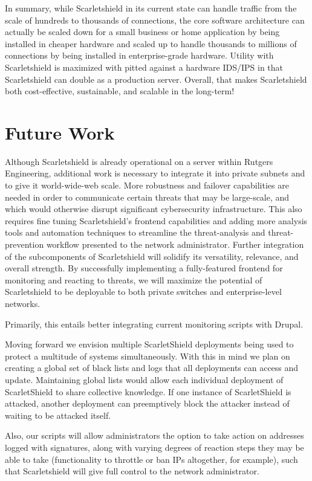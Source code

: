 \documentclass[12pt,letterpaper,titlepage]{report}
\begin{document}
{In summary, while Scarletshield in its current state can handle traffic from the
scale of hundreds to thousands of connections, the core software architecture
can actually be scaled down for a small business or home application by being
installed in cheaper hardware and scaled up to handle thousands to millions of
connections by being installed in enterprise-grade hardware.  Utility with
Scarletshield is maximized with pitted against a hardware IDS/IPS in that
Scarletshield can double as a production server.  Overall, that makes
Scarletshield both cost-effective, sustainable, and scalable in the long-term!


\section{Future Work}

Although Scarletshield is already operational on a server within Rutgers
Engineering, additional work is necessary to integrate it into private subnets
and to give it world-wide-web scale. More robustness and failover capabilities
are needed in order to communicate certain threats that may be large-scale, and
which would otherwise disrupt significant cybersecurity infrastructure. This
also requires fine tuning Scarletshield’s frontend capabilities and adding more
analysis tools and automation techniques to streamline the threat-analysis and
threat-prevention workflow presented to the network administrator.  Further
integration of the subcomponents of Scarletshield will solidify its versatility,
relevance, and overall strength.  By successfully implementing a fully-featured
frontend for monitoring and reacting to threats, we will maximize the potential
of Scarletshield to be deployable to both private switches and enterprise-level
networks.

Primarily, this entails better integrating current monitoring scripts with
Drupal.

Moving forward we envision multiple ScarletShield deployments being used to
protect a multitude of systems simultaneously.  With this in mind we plan on
creating a global set of black lists and logs that all deployments can
access and update.  Maintaining global lists would allow each individual
deployment of ScarletShield to share collective knowledge. If one instance
of ScarletShield is attacked, another deployment can preemptively block the
attacker instead of waiting to be attacked itself.

Also, our scripts will allow administrators the option to take action on
addresses logged with signatures, along with varying degrees of reaction
steps they may be able to take (functionality to throttle or ban IPs
altogether, for example), such that Scarletshield will give full control to
the network administrator.

}
\end{document}
